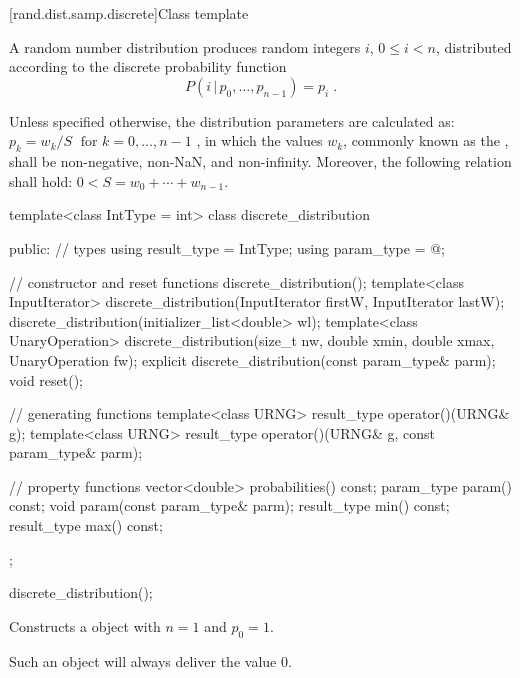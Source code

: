 [rand.dist.samp.discrete]{Class template }%
%

\pnum
A  random number distribution
produces random integers $i$, $0 \leq i < n$,
distributed according to
the discrete probability function%
%
\[%
 P(i\,|\,p_0,\ldots,p_{n-1})
      = p_i
\; \mbox{.}
\]

\pnum
Unless specified otherwise,
the distribution parameters are calculated as:
 $p_k = {w_k / S} \; \mbox{  for } k = 0, \ldots, n\!-\!1$ ,
in which
the values $w_k$,
commonly known as the %
%
%
, shall be non-negative, non-NaN, and non-infinity.
Moreover, the following relation shall hold:
 $ 0 < S = w_0 + \cdots + w_{n-1} $.

\begin{codeblock}
template<class IntType = int>
 class discrete_distribution
{
public:
 // types
 using result_type = IntType;
 using param_type  = @\unspec@;

 // constructor and reset functions
 discrete_distribution();
 template<class InputIterator>
   discrete_distribution(InputIterator firstW, InputIterator lastW);
 discrete_distribution(initializer_list<double> wl);
 template<class UnaryOperation>
   discrete_distribution(size_t nw, double xmin, double xmax, UnaryOperation fw);
 explicit discrete_distribution(const param_type& parm);
 void reset();

 // generating functions
 template<class URNG>
   result_type operator()(URNG& g);
 template<class URNG>
   result_type operator()(URNG& g, const param_type& parm);

 // property functions
 vector<double> probabilities() const;
 param_type param() const;
 void param(const param_type& parm);
 result_type min() const;
 result_type max() const;
};
\end{codeblock}

\begin{itemdecl}
discrete_distribution();
\end{itemdecl}

\begin{itemdescr}
\pnum\effects Constructs a  object
 with $ n = 1 $
 and $ p_0 = 1 $.
 \begin{note}
   Such an object will always deliver the value $0$.
 \end{note}
\end{itemdescr}


